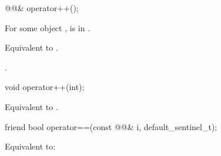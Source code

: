 %
\begin{itemdecl}
@@& operator++();
\end{itemdecl}

\begin{itemdescr}
\pnum
\expects
For some  object ,
 is in .

\pnum
\effects
Equivalent to .

\pnum
\returns
{}.
\end{itemdescr}

%
\begin{itemdecl}
void operator++(int);
\end{itemdecl}

\begin{itemdescr}
\pnum
\effects
Equivalent to .
\end{itemdescr}

%
\begin{itemdecl}
friend bool operator==(const @@& i, default_sentinel_t);
\end{itemdecl}

\begin{itemdescr}
\pnum
\effects
Equivalent to: 
\end{itemdescr}
